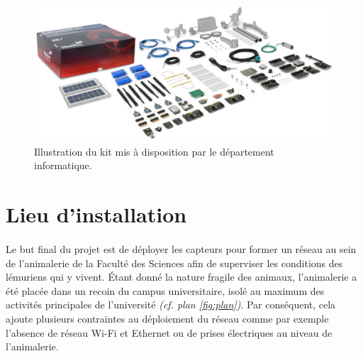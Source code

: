         \begin{figure}[h]
            \centering
            \includegraphics[scale=0.4]{images/photos/evaluator.png}
            \caption{Illustration du kit mis à disposition par le département informatique.}
            \label{fig:eval}
        \end{figure}


    
\section{Lieu d'installation}
    \paragraph{}Le but final du projet est de déployer les capteurs pour former un réseau au sein de l'animalerie de la Faculté des Sciences afin de superviser les conditions des lémuriens qui y vivent. Étant donné la nature fragile des animaux, l'animalerie a été placée dans un recoin du campus universitaire, isolé au maximum des activités principales de l'université \textit{(cf. plan \ref{fig:plan})}. Par conséquent, cela ajoute plusieurs contraintes au déploiement du réseau comme par exemple l'absence de réseau Wi-Fi et Ethernet ou de prises électriques au niveau de l'animalerie.

